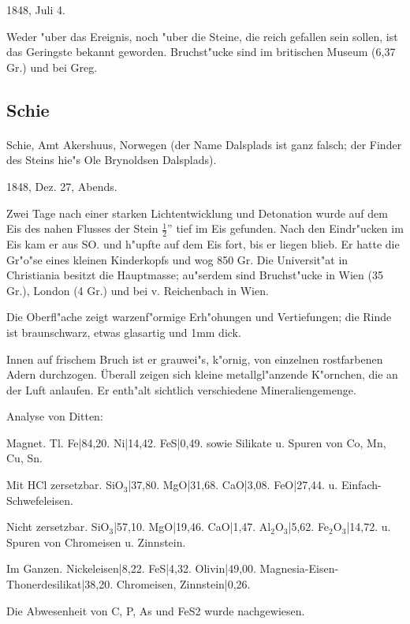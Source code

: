 \documentclass[a4paper, 11pt, oneside]{article}
\begin{document}
1848, Juli 4.

Weder "uber das Ereignis, noch "uber die Steine, die reich gefallen sein sollen, ist das Geringste bekannt geworden. Bruchst"ucke sind im britischen Museum (6,37 Gr.) und bei Greg.

\subsection{Schie}
\normalsize
\paragraph{}
Schie, Amt Akershuus, Norwegen (der Name Dalsplads ist ganz falsch; der Finder des Steins hie"s Ole Brynoldsen Dalsplads).

1848, Dez. 27, Abends.

Zwei Tage nach einer starken Lichtentwicklung und Detonation wurde auf dem Eis des nahen Flusses der Stein $\frac{1}{2}$” tief im Eis gefunden. Nach den Eindr"ucken im Eis kam er aus SO. und h"upfte auf dem Eis fort, bis er liegen blieb. Er hatte die Gr"o"se eines kleinen Kinderkopfs und wog 850 Gr. Die Universit"at in Christiania besitzt die Hauptmasse; au"serdem sind Bruchst"ucke in Wien (35 Gr.), London (4 Gr.) und bei v. Reichenbach in Wien.

Die Oberfl"ache zeigt warzenf"ormige Erh"ohungen und Vertiefungen; die Rinde ist braunschwarz, etwas glasartig und 1mm dick.

Innen auf frischem Bruch ist er grauwei"s, k"ornig, von einzelnen rostfarbenen Adern durchzogen. Überall zeigen sich kleine metallgl"anzende K"ornchen, die an der Luft anlaufen. Er enth"alt sichtlich verschiedene Mineraliengemenge.

Analyse von Ditten:

Magnet. Tl.
Fe|84,20.  
Ni|14,42.  
FeS|0,49.  
sowie Silikate u. Spuren von Co, Mn, Cu, Sn.

Mit HCl zersetzbar.  
SiO$_{3}$|37,80.  
MgO|31,68.  
CaO|3,08.  
FeO|27,44.  
u. Einfach-Schwefeleisen.

Nicht zersetzbar.  
SiO$_{3}$|57,10.  
MgO|19,46.  
CaO|1,47.  
Al$_{2}$O$_{3}$|5,62.  
Fe$_{2}$O$_{3}$|14,72.  
u. Spuren von Chromeisen u. Zinnstein.

Im Ganzen.  
Nickeleisen|8,22.  
FeS|4,32.  
Olivin|49,00.  
Magnesia-Eisen-Thonerdesilikat|38,20.  
Chromeisen, Zinnstein|0,26.

Die Abwesenheit von C, P, As und FeS2 wurde nachgewiesen.
\end{document}
